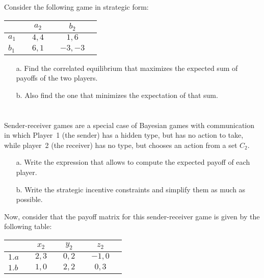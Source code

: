 \documentclass{../ape}
\begin{document}

\section{}
Consider the following game in strategic form:

	\begin{center}
		\begin{tabular}[h!]{l|ccccc}
			&& $a_2$ && $b_2$ & \\
			\hline
			$a_1$ && $4,4$ && $1,6$ & \\
			$b_1$ && $6,1$ && $-3,-3$ & 
		\end{tabular} 
	\end{center}

\begin{enumerate}
	\item[a.] Find the correlated equilibrium that maximizes the expected sum of payoffs of the two players.
	\item[b.] Also find the one that minimizes the expectation of that sum.
\end{enumerate}

\section{}
Sender-receiver games are a special case of Bayesian games with communication in which Player~1 (the sender) has a hidden type, but has no action to take, while player~2 (the receiver) has no type, but chooses an action from a set $C_2$.

\begin{enumerate}
	\item[a.] Write the expression that allows to compute the expected payoff of each player.
	\item[b.] Write the strategic incentive constraints and simplify them as much as possible.
\end{enumerate}

Now, consider that the payoff matrix for this sender-receiver game is given by the following table:

\begin{center}
	\begin{tabular}[h!]{l|ccccccc}
		&& $x_2$ && $y_2$ && $z_2$ & \\
		\hline
		$1.a$ && $2,3$ && $0,2$ && $-1,0$ & \\
		$1.b$ && $1,0$ && $2,2$ && $0,3$ & 
	\end{tabular} 
\end{center}
	
\end{document}

